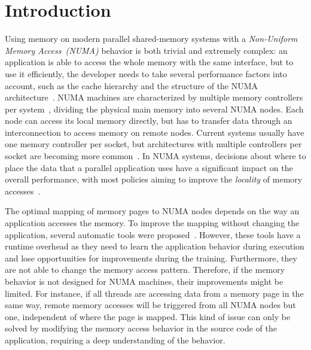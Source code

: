 
\section{Introduction}
\label{sec:intro}

Using memory on modern parallel shared-memory systems with a \emph{Non-Uniform Memory Access~(NUMA)} behavior is both trivial and extremely complex: an application is able to access the whole memory with the same interface, but to use it efficiently, the developer needs to take several performance factors into account, such as the cache hierarchy and the structure of the NUMA architecture~\cite{Drepper07What}.
NUMA machines are characterized by multiple memory controllers per system~\cite{Awasthi2010}, dividing the physical main memory into several NUMA nodes.
Each node can access its local memory directly, but has to transfer data through an interconnection to access memory on remote nodes.
Current systems usually have one memory controller per socket, but architectures with multiple controllers per socket are becoming more common~\cite{AMD2012}.
In NUMA systems, decisions about where to place the data that a parallel application uses have a significant impact on the overall performance, with most policies aiming to improve the \emph{locality} of memory accesses~\cite{Diener2015}.

The optimal mapping of memory pages to NUMA nodes depends on the way an application accesses the memory.
To improve the mapping without changing the application, several automatic tools were proposed~\cite{Corbet2012,Corbet,Dashti2013,Diener2014,Piccoli2014}.
However, these tools have a runtime overhead as they need to learn the application behavior during execution and lose opportunities for improvements during the training.
Furthermore, they are not able to change the memory access pattern.
Therefore, if the memory behavior is not designed for NUMA machines, their improvements might be limited.
For instance, if all threads are accessing data from a memory
page in the same way, remote memory accesses will be triggered from all NUMA nodes but one, independent of where the page is mapped.
This kind of issue can only be solved by modifying the memory access behavior in the source code of the application, requiring a deep understanding of the behavior.

